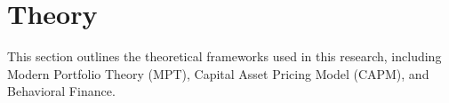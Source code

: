 \section{Theory}
This section outlines the theoretical frameworks used in this research, including Modern Portfolio Theory (MPT), Capital Asset Pricing Model (CAPM), and Behavioral Finance.



